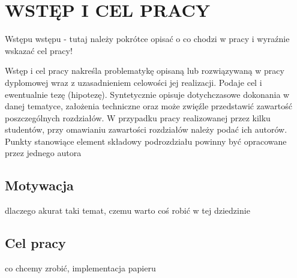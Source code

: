 \chapter{WSTĘP I CEL PRACY}
\label{chap:introduction}
Wstępu wstępu - tutaj należy pokrótce opisać o co chodzi w pracy i wyraźnie wskazać cel pracy!

Wstęp i cel pracy nakreśla problematykę opisaną lub rozwiązywaną w pracy dyplomowej wraz z uzasadnieniem celowości jej realizacji. Podaje cel i ewentualnie tezę (hipotezę). Syntetycznie opisuje dotychczasowe dokonania w danej tematyce, założenia techniczne oraz może zwięźle przedstawić zawartość poszczególnych rozdziałów. W przypadku pracy realizowanej przez kilku studentów, przy omawianiu zawartości rozdziałów należy podać ich autorów. Punkty stanowiące element składowy podrozdziału powinny być opracowane przez jednego autora

\section{Motywacja}

dlaczego akurat taki temat, czemu warto coś robić w tej dziedzinie

\section{Cel pracy}

co chcemy zrobić, implementacja papieru
